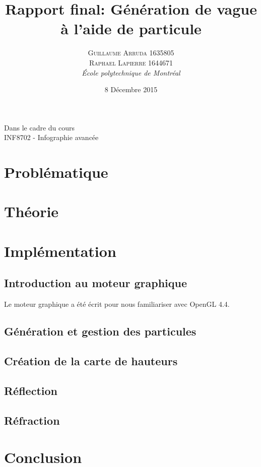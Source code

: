 \documentclass[a4paper, 12pt]{article} %
\title{Rapport final: Génération de vague à l'aide de particule}
\author{\textsc{Guillaume Arruda 1635805\\Raphael Lapierre 1644671} %
\vspace{10pt}
\\{\textit{École polytechnique de Montréal}}} %
\date{8 Décembre 2015} %
\makeatletter
\renewcommand{\maketitle}{ %
\begin{center} %

\vspace*{25pt} %
{\LARGE\@title} %

\vspace{125pt} %

{\large\@author} %

\vspace{125pt} %
Dans le cadre du cours
\\INF8702 - Infographie avancée
\vspace{125pt} %
\\\@date %
\vspace{125pt} %

\end{center}
}
\makeatother
\begin{document}
\thispagestyle{empty}
\clearpage\maketitle %
\pagebreak[4]
\tableofcontents
\pagebreak[4]

\setlength{\headheight}{15.0pt}
\pagestyle{fancy}
\fancyhead[C]{}

\section*{Problématique}
\section*{Théorie}
\section*{Implémentation}
\subsection{Introduction au moteur graphique}
Le moteur graphique a été écrit pour nous familiariser avec OpenGL 4.4. 
\subsection*{Génération et gestion des particules}
\subsection*{Création de la carte de hauteurs}
\subsection*{Réflection}
\subsection*{Réfraction}
\section*{Conclusion}
\end{document}
